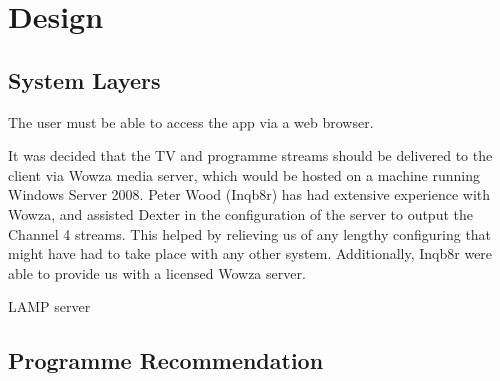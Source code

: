 \section{Design}

\subsection{System Layers}
The user must be able to access the app via a web browser.

It was decided that the TV and programme streams should be delivered to the client via Wowza media server, which would be hosted on a machine running Windows Server 2008. Peter Wood (Inqb8r) has had extensive experience with Wowza, and assisted Dexter in the configuration of the server to output the Channel 4 streams. This helped by relieving us of any lengthy configuring that might have had to take place with any other system. Additionally, Inqb8r were able to provide us with a licensed Wowza server.

LAMP server

\subsection{Programme Recommendation}

